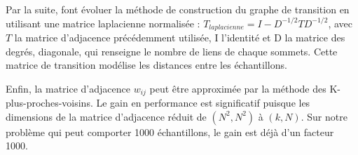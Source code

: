 Par la suite, \citeauthor{zhou_learning_2003} \cite{zhou_learning_2003} font évoluer la méthode de construction du graphe de transition en utilisant une matrice laplacienne normalisée : $T_{laplacienne} = I - D^{-1/2} T D^{-1/2}$, avec $T$ la matrice d'adjacence précédemment utilisée, I l'identité et D la matrice des degrés, diagonale, qui renseigne le nombre de liens de chaque sommets.
Cette matrice de transition modélise les distances entre les échantillons.

Enfin, la matrice d'adjacence $w_{ij}$ peut être approximée par la méthode des K-plus-proches-voisins.
Le gain en performance est significatif puisque les dimensions de la matrice d'adjacence réduit de $(N^2, N^2)$ à $(k, N)$.
Sur notre problème qui peut comporter 1000 échantillons, le gain est déjà d'un facteur 1000.

%


%
%
%
%

